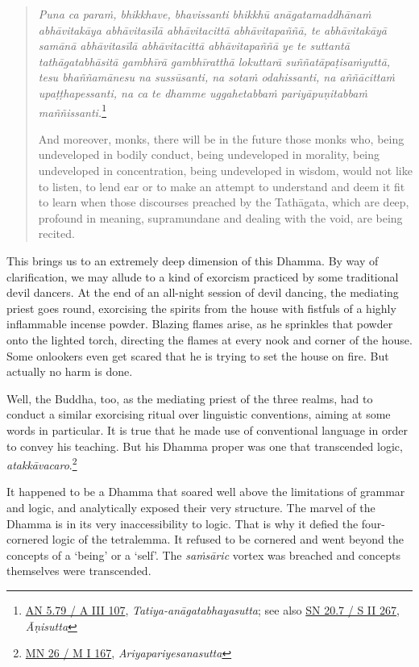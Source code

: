 \begin{quote}
\emph{Puna ca paraṁ, bhikkhave, bhavissanti bhikkhū anāgatamaddhānaṁ abhāvitakāya abhāvitasīlā abhāvitacittā abhāvitapaññā, te abhāvitakāyā samānā abhāvitasīlā abhāvitacittā abhāvitapaññā ye te suttantā tathāgatabhāsitā gambhīrā gambhīratthā lokuttarā suññatāpaṭisaṁyuttā, tesu bhaññamānesu na sussūsanti, na sotaṁ odahissanti, na aññācittaṁ upaṭṭhapessanti, na ca te dhamme uggahetabbaṁ pariyāpuṇitabbaṁ maññissanti.}\footnote{\href{https://suttacentral.net/an5.79/pli/ms}{AN 5.79 / A III 107}, \emph{Tatiya-anāgatabhayasutta}; see also \href{https://suttacentral.net/sn20.7/pli/ms}{SN 20.7 / S II 267}, \emph{Āṇisutta}}

And moreover, monks, there will be in the future those monks who, being undeveloped in bodily conduct, being undeveloped in morality, being undeveloped in concentration, being undeveloped in wisdom, would not like to listen, to lend ear or to make an attempt to understand and deem it fit to learn when those discourses preached by the Tathāgata, which are deep, profound in meaning, supramundane and dealing with the void, are being recited.
\end{quote}

This brings us to an extremely deep dimension of this Dhamma. By way of clarification, we may allude to a kind of exorcism practiced by some traditional devil dancers. At the end of an all-night session of devil dancing, the mediating priest goes round, exorcising the spirits from the house with fistfuls of a highly inflammable incense powder. Blazing flames arise, as he sprinkles that powder onto the lighted torch, directing the flames at every nook and corner of the house. Some onlookers even get scared that he is trying to set the house on fire. But actually no harm is done.

Well, the Buddha, too, as the mediating priest of the three realms, had to conduct a similar exorcising ritual over linguistic conventions, aiming at some words in particular. It is true that he made use of conventional language in order to convey his teaching. But his Dhamma proper was one that transcended logic, \emph{atakkāvacaro}.\footnote{\href{https://suttacentral.net/mn26/pli/ms}{MN 26 / M I 167}, \emph{Ariyapariyesanasutta}}

It happened to be a Dhamma that soared well above the limitations of grammar and logic, and analytically exposed their very structure. The marvel of the Dhamma is in its very inaccessibility to logic. That is why it defied the four-cornered logic of the tetralemma. It refused to be cornered and went beyond the concepts of a `being' or a `self'. The \emph{saṁsāric} vortex was breached and concepts themselves were transcended.

